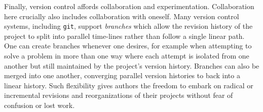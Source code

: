 Finally, version control affords collaboration and experimentation.
Collaboration here crucially also includes collaboration with oneself. Many
version control systems, including \texttt{git}, support \emph{branches} which
allow the revision history of the project to split into parallel time-lines
rather than follow a single linear path. One can create branches whenever one
desires, for example when attempting to solve a problem in more than one way
where each attempt is isolated from one another but still maintained by the
project's version history. Branches can also be merged into one another,
converging parallel version histories to back into a linear history. Such
flexibility gives authors the freedom to embark on radical or incremental
revisions and reorganizations of their projects without fear of confusion or
lost work.

